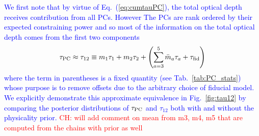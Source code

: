 \documentclass[prd,twocolumn,amsmath,amssymb,floatfix,superscriptaddress,nofootinbib]{revtex4-1}
\newcommand{\beq}{\begin{equation}}
\newcommand{\eeq}{\end{equation}}
\newcommand{\wh}[1]{\textcolor{blue}{#1}}
\newcommand{\ch}[1]{\textcolor{red}{#1}}
\begin{document}
\wh{
 We first note that by virtue of Eq.~(\ref{eq:cumtauPC}), the total optical depth receives contribution from all PCs.  However
The PCs are rank ordered by their expected constraining power and so most of the information on the total optical depth comes from
the first two components
\beq
\tau_{\rm PC} \approx \tau_{12} \equiv  m_1 \tau_1 + m_2 \tau_2 +
\left(\sum_{a=3}^5 \bar m_a \tau_a + \tau_{\rm fid}\right) 
\label{eq:tau12}
\eeq
where the term in parentheses is a fixed quantity (see Tab.~\ref{tab:PC_stats}) whose purpose is to remove offsets due to the arbitrary choice of fiducial model.  We explicitly demonstrate this approximate equivalence in Fig.~\ref{fig:tau12} by comparing the
posterior distributions of $\tau_{\rm PC}$ and $\tau_{12}$ both with and without the physicality prior.  
}\ch{CH: will add comment on mean from m3, m4, m5 that are computed from the chains with prior as well}
\end{document}
